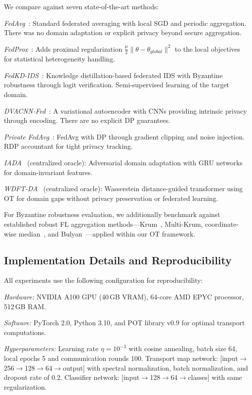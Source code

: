 \documentclass{ieeeaccess}
\theoremstyle{plain}
\theoremstyle{definition}
\theoremstyle{remark}
\begin{document}
We compare against seven state-of-the-art methods:

\textit{FedAvg}~\cite{mcmahan2017}: Standard federated averaging with local SGD and periodic aggregation. There was no domain adaptation or explicit privacy beyond secure aggregation.

\textit{FedProx}~\cite{li2020}: Adds proximal regularization $\frac{\mu}{2}\|\theta-\theta_{global}\|^2$ to the local objectives for statistical heterogeneity handling.

\textit{FedKD-IDS}~\cite{zhao2022}: Knowledge distillation-based federated IDS with Byzantine robustness through logit verification. Semi-supervised learning of the target domain.

\textit{DVACNN-Fed}~\cite{preuveneers2018}: A variational autoencoder with CNNs providing intrinsic privacy through encoding. There are no explicit DP guarantees.

\textit{Private FedAvg}~\cite{abadi2016}: FedAvg with DP through gradient clipping and noise injection. RDP accountant for tight privacy tracking.

\textit{IADA}~\cite{chen2023} (centralized oracle): Adversarial domain adaptation with GRU networks for domain-invariant features.

\textit{WDFT-DA}~\cite{rasheed2022} (centralized oracle): Wasserstein distance-guided transformer using OT for domain gaps without privacy preservation or federated learning.

For Byzantine robustness evaluation, we additionally benchmark against established robust FL aggregation methods---Krum~\cite{blanchard2017}, Multi-Krum, coordinate-wise median~\cite{yin2018}, and Bulyan~\cite{guerraoui2018}---applied within our OT framework.

\subsection{Implementation Details and Reproducibility}

All experiments use the following configuration for reproducibility:

\textit{Hardware:} NVIDIA A100 GPU (40\,GB VRAM), 64-core AMD EPYC processor, 512\,GB RAM.

\textit{Software:} PyTorch 2.0, Python 3.10, and POT library v0.9 for optimal transport computations.

\textit{Hyperparameters:} Learning rate $\eta = 10^{-3}$ with cosine annealing, batch size 64, local epochs 5 and communication rounds 100. Transport map network: [input$\to$256$\to$128$\to$64$\to$output] with spectral normalization, batch normalization, and dropout rate of 0.2. Classifier network: [input$\to$128$\to$64$\to$classes] with same regularization.
\end{document}
